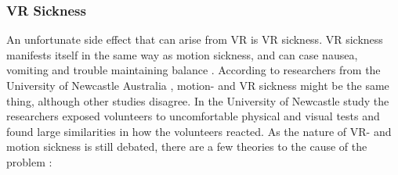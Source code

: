             \subsubsection{VR Sickness}
                An unfortunate side effect that can arise from VR is VR sickness. VR sickness manifests itself in the same way as motion sickness, and can case nausea, vomiting and trouble maintaining balance \cite{motion_sickness}. According to researchers from the University of Newcastle Australia \cite{vr_sickness}, motion- and VR sickness might be the same thing, although other studies disagree. In the University of Newcastle study the researchers exposed volunteers to uncomfortable physical and visual tests and found large similarities in how the volunteers reacted. As the nature of VR- and motion sickness is still debated, there are a few theories to the cause of the problem \cite{vr_sickness_theories}:
                
